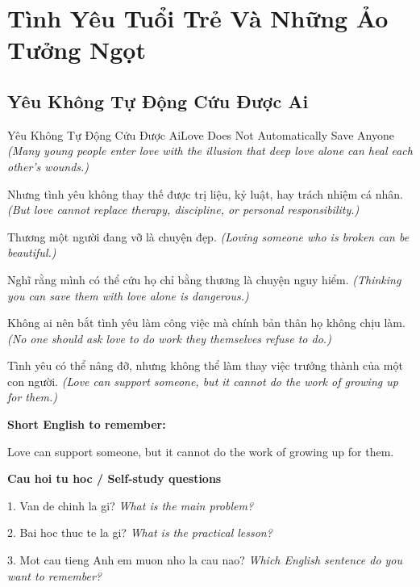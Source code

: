 \chapter{Tình Yêu Tuổi Trẻ Và Những Ảo Tưởng Ngọt}

\section{Yêu Không Tự Động Cứu Được Ai}
\begin{truyen}{Yêu Không Tự Động Cứu Được Ai}{Love Does Not Automatically Save Anyone}
\textit{(Many young people enter love with the illusion that deep love alone can heal each other’s wounds.)}

Nhưng tình yêu không thay thế được trị liệu, kỷ luật, hay trách nhiệm cá nhân.
\textit{(But love cannot replace therapy, discipline, or personal responsibility.)}

Thương một người đang vỡ là chuyện đẹp.
\textit{(Loving someone who is broken can be beautiful.)}

Nghĩ rằng mình có thể cứu họ chỉ bằng thương là chuyện nguy hiểm.
\textit{(Thinking you can save them with love alone is dangerous.)}

Không ai nên bắt tình yêu làm công việc mà chính bản thân họ không chịu làm.
\textit{(No one should ask love to do work they themselves refuse to do.)}

\end{truyen}

\begin{baihoc}
Tình yêu có thể nâng đỡ, nhưng không thể làm thay việc trưởng thành của một con người.
\textit{(Love can support someone, but it cannot do the work of growing up for them.)}
\end{baihoc}

\begin{ghinhoanh}
\textbf{Short English to remember:}

Love can support someone, but it cannot do the work of growing up for them.

\end{ghinhoanh}

\begin{tuhocnhanh}
\textbf{Cau hoi tu hoc / Self-study questions}

1. Van de chinh la gi? \textit{What is the main problem?}

2. Bai hoc thuc te la gi? \textit{What is the practical lesson?}

3. Mot cau tieng Anh em muon nho la cau nao? \textit{Which English sentence do you want to remember?}
\end{tuhocnhanh}
\ngancach

